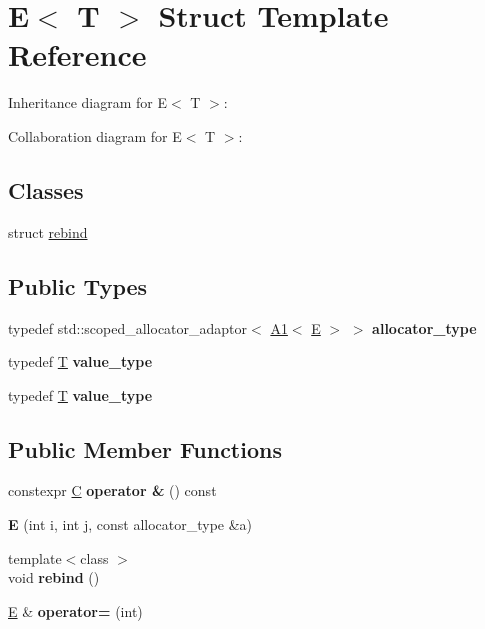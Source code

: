 \hypertarget{struct_e}{}\section{E$<$ T $>$ Struct Template Reference}
\label{struct_e}


Inheritance diagram for E$<$ T $>$\+:


Collaboration diagram for E$<$ T $>$\+:
\subsection*{Classes}
\begin{DoxyCompactItemize}
\item 
struct \mbox{\hyperlink{struct_e_1_1rebind}{rebind}}
\end{DoxyCompactItemize}
\subsection*{Public Types}
\begin{DoxyCompactItemize}
\item 
\mbox{\label{struct_e_a9742fbc5fb505bc529d5d3f5f483d9a2}} 
typedef std\+::scoped\+\_\+allocator\+\_\+adaptor$<$ \mbox{\hyperlink{struct_a1}{A1}}$<$ \mbox{\hyperlink{struct_e}{E}} $>$ $>$ {\bfseries allocator\+\_\+type}
\item 
\mbox{\label{struct_e_abe0cc485edd2eeb4368dd45d091dd196}} 
typedef \mbox{\hyperlink{struct_t}{T}} {\bfseries value\+\_\+type}
\item 
\mbox{\label{struct_e_abe0cc485edd2eeb4368dd45d091dd196}} 
typedef \mbox{\hyperlink{struct_t}{T}} {\bfseries value\+\_\+type}
\end{DoxyCompactItemize}
\subsection*{Public Member Functions}
\begin{DoxyCompactItemize}
\item 
\mbox{\label{struct_e_ab754ac098cd71b6f851872aedba423ef}} 
constexpr \mbox{\hyperlink{struct_c}{C}} {\bfseries operator \&} () const
\item 
\mbox{\label{struct_e_a44b0c2e1194115f2bdb17ad2092912a6}} 
{\bfseries E} (int i, int j, const allocator\+\_\+type \&a)
\item 
\mbox{\label{struct_e_a5bd577f7b2f1852e76af98c719542b9c}} 
{\footnotesize template$<$class $>$ }\\void {\bfseries rebind} ()
\item 
\mbox{\label{struct_e_ad649b705985833e70fa5c71deb77515b}} 
\mbox{\hyperlink{struct_e}{E}} \& {\bfseries operator=} (int)
\end{DoxyCompactItemize}
